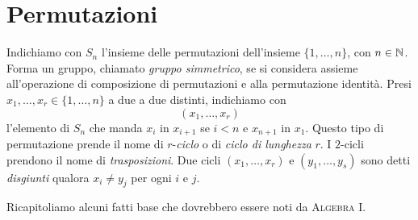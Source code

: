 
\section{Permutazioni}

Indichiamo con $S_n$ l'insieme delle permutazioni dell'insieme $\{1, \dots{}, n\}$, con $n \in \mathbb{N}$. Forma un gruppo, chiamato {\em gruppo simmetrico}, se si considera assieme all'operazione di composizione di permutazioni e alla permutazione identità. Presi $x_1, \dots{}, x_r \in \{1, \dots{}, n\}$ a due a due distinti, indichiamo con
\[(x_1, \dots{}, x_r)\]
l'elemento di $S_n$ che manda $x_i$ in $x_{i+1}$ se $i < n$ e $x_{n+1}$ in $x_1$. Questo tipo di permutazione prende il nome di $r$-{\em ciclo} o di {\em ciclo di lunghezza} $r$. I $2$-cicli prendono il nome di {\em trasposizioni}. Due cicli $(x_1, \dots{}, x_r)$ e $(y_1, \dots{},y_s)$ sono detti {\em disgiunti} qualora $x_i \ne y_j$ per ogni $i$ e $j$.

Ricapitoliamo alcuni fatti base che dovrebbero essere noti da {\scshape Algebra I}.


